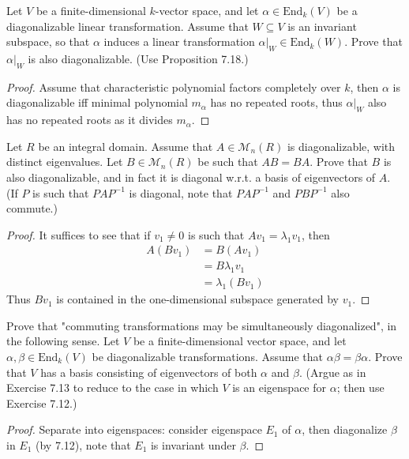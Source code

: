 \documentclass[openany]{book}
\begin{document}
\begin{prob}[7.12]
    Let \( V \) be a finite-dimensional \( k \)-vector space, and let \( \alpha \in \text{End}_k(V) \) be a diagonalizable linear transformation. Assume that \( W \subseteq V \) is an invariant subspace, so that \( \alpha \) induces a linear transformation \( \alpha|_W \in \text{End}_k(W) \). Prove that \( \alpha|_W \) is also diagonalizable. (Use Proposition 7.18.)
\end{prob}
\begin{proof}
    Assume that characteristic polynomial factors completely over $k$, then $\alpha$ is diagonalizable iff minimal polynomial $m_\alpha$ has no repeated roots, thus $\alpha\vert_W$ also has no repeated roots as it divides $m_\alpha$.
\end{proof}


\begin{prob}[7.13]
    Let \( R \) be an integral domain. Assume that \( A \in \mathcal{M}_n(R) \) is diagonalizable, with distinct eigenvalues. Let \( B \in \mathcal{M}_n(R) \) be such that \( AB = BA \). Prove that \( B \) is also diagonalizable, and in fact it is diagonal w.r.t. a basis of eigenvectors of \( A \). (If \( P \) is such that \( PAP^{-1} \) is diagonal, note that \( PAP^{-1} \) and \( PBP^{-1} \) also commute.)
\end{prob}
\begin{proof}
    It suffices to see that if $v_1\neq 0$ is such that $Av_1=\lambda_1v_1$, then
    \begin{align*}
        A(Bv_1)&=B(Av_1)\\
        &=B\lambda_1v_1\\
        &=\lambda_1(Bv_1)
    \end{align*}
    Thus $Bv_1$ is contained in the one-dimensional subspace generated by $v_1$.
\end{proof}


\begin{prob}[7.14]
    Prove that "commuting transformations may be simultaneously diagonalized", in the following sense. Let \( V \) be a finite-dimensional vector space, and let \( \alpha, \beta \in \text{End}_k(V) \) be diagonalizable transformations. Assume that \( \alpha\beta = \beta\alpha \). Prove that \( V \) has a basis consisting of eigenvectors of both \( \alpha \) and \( \beta \). (Argue as in Exercise 7.13 to reduce to the case in which \( V \) is an eigenspace for \( \alpha \); then use Exercise 7.12.)
\end{prob}
\begin{proof}
    Separate into eigenspaces: consider eigenspace $E_1$ of $\alpha$, then diagonalize $\beta$ in $E_1$ (by 7.12), note that $E_1$ is invariant under $\beta$.
\end{proof}
\end{document}
